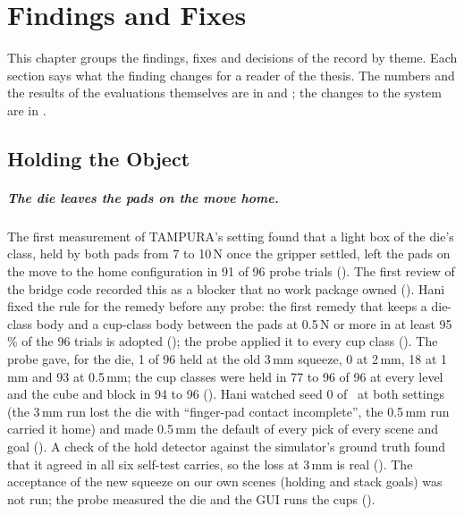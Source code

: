 
\chapter{Findings and Fixes}
\label{ch:findings}

This chapter groups the findings, fixes and decisions of the record by theme. Each
section says what the finding changes for a reader of the thesis. The numbers and
the results of the evaluations themselves are in  and
; the changes to the system are in .

\section{Holding the Object}
\label{sec:holding-findings}

\paragraph{The die leaves the pads on the move home.} The first measurement of
TAMPURA's setting found that a light box of the die's class, held by both pads
from 7 to 10\,N once the gripper settled, left the pads on the move to the home
configuration in 91 of 96 probe trials (). The first review of the bridge
code recorded this as a blocker that no work package owned (). Hani fixed
the rule for the remedy before any probe: the first remedy that keeps a die-class
body and a cup-class body between the pads at 0.5\,N or more in at least 95\,\%
of the 96 trials is adopted (); the probe applied it to every cup class
(). The probe gave, for the die, 1 of 96
held at the old 3\,mm squeeze, 0 at 2\,mm, 18 at 1\,mm and 93 at 0.5\,mm; the cup
classes were held in 77 to 96 of 96 at every level and the cube and block in 94 to
96 (). Hani watched seed 0 of \fdice\ at both settings (the 3\,mm run lost
the die with ``finger-pad contact incomplete'', the 0.5\,mm run carried it home) and
made 0.5\,mm the default of every pick of every scene and goal (). A check
of the hold detector against the simulator's ground truth found that it agreed in
all six self-test carries, so the loss at 3\,mm is real (). The
acceptance of the new squeeze on our own scenes (holding and stack goals) was not
run; the probe measured the die and the GUI runs the cups ().

